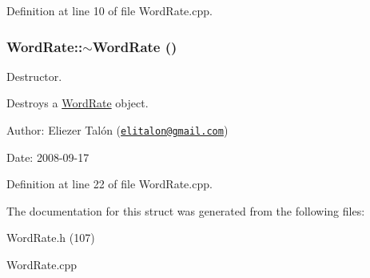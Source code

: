 Definition at line 10 of file WordRate.cpp.\hypertarget{struct_word_rate_a86a63516e4c3d4e8aa9060ea5be6b23}{
\subsubsection[$\sim$WordRate]{\setlength{\rightskip}{0pt plus 5cm}WordRate::$\sim$WordRate ()}}
\label{struct_word_rate_a86a63516e4c3d4e8aa9060ea5be6b23}


Destructor. 

Destroys a \hyperlink{struct_word_rate}{WordRate} object.

\begin{Desc}
\item[Author:]Eliezer Talón (\href{mailto:elitalon@gmail.com}{\tt elitalon@gmail.com}) \end{Desc}
\begin{Desc}
\item[Date:]2008-09-17 \end{Desc}


Definition at line 22 of file WordRate.cpp.

The documentation for this struct was generated from the following files:\begin{CompactItemize}
\item 
WordRate.h (107)\item 
WordRate.cpp\end{CompactItemize}
